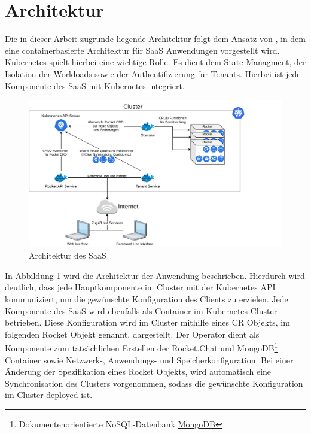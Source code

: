 \section{Architektur}
\label{sec:komponenten:architektur}

Die in dieser Arbeit zugrunde liegende Architektur folgt dem Ansatz von \cite{Truyen2016}, in dem eine containerbasierte
Architektur für \ac{SaaS} Anwendungen vorgestellt wird. Kubernetes spielt hierbei eine wichtige Rolle. Es dient dem State
Managment, der Isolation der Workloads sowie der Authentifizierung für Tenants. Hierbei ist jede Komponente des \ac{SaaS}
mit Kubernetes integriert.

\begin{figure}[h]
  \includegraphics[width=45em]{gfx/chapters/3_komponenten/saas_architecture.pdf}
  \caption{Architektur des \ac{SaaS}}
  \label{fig:architektur}
\end{figure}

In Abbildung \ref{fig:architektur} wird die Architektur der Anwendung beschrieben.
Hierdurch wird deutlich, dass jede Hauptkomponente im Cluster mit der Kubernetes API kommuniziert,
um die gewünschte Konfiguration des Clients zu erzielen.
Jede Komponente des \ac{SaaS} wird ebenfalls als Container im Kubernetes Cluster betrieben.
Diese Konfiguration wird im Cluster mithilfe eines \ac{CR} Objekts, im folgenden Rocket Objekt genannt, dargestellt.
Der Operator dient als Komponente zum tatsächlichen
Erstellen der Rocket.Chat und MongoDB\footnote{Dokumentenorientierte NoSQL-Datenbank \href{https://www.mongodb.com/}{MongoDB}}
Container sowie Netzwerk-, Anwendungs- und Speicherkonfiguration.
Bei einer Änderung der Spezifikation eines Rocket Objekts, wird automatisch eine Synchronisation des 
Clusters vorgenommen, sodass die gewünschte Konfiguration im Cluster deployed ist.

